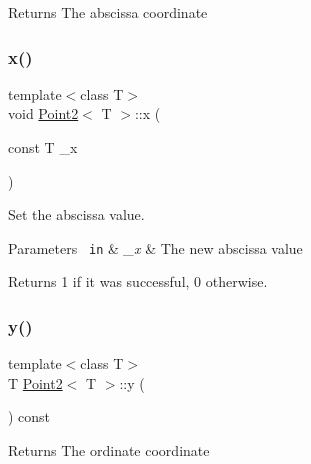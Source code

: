 \begin{DoxyReturn}{Returns}
The abscissa coordinate 
\end{DoxyReturn}
\mbox{\label{class_point2_a0693b1a0d34cb1dd3a4d30ea078a4d5e}} 
\subsubsection{\texorpdfstring{x()}{x()}\hspace{0.1cm}{\footnotesize\ttfamily [2/2]}}
{\footnotesize\ttfamily template$<$class T$>$ \\
void \mbox{\hyperlink{class_point2}{Point2}}$<$ T $>$\+::x (\begin{DoxyParamCaption}\item[{const T}]{\+\_\+x }\end{DoxyParamCaption})\hspace{0.3cm}{\ttfamily [inline]}}



Set the abscissa value. 


\begin{DoxyParams}[1]{Parameters}
\mbox{\texttt{ in}}  & {\em \+\_\+x} & The new abscissa value \\
\hline
\end{DoxyParams}
\begin{DoxyReturn}{Returns}
1 if it was successful, 0 otherwise. 
\end{DoxyReturn}
\mbox{\label{class_point2_ad7138ca15abc7937b9b1fdb0a84d229c}} 
\subsubsection{\texorpdfstring{y()}{y()}\hspace{0.1cm}{\footnotesize\ttfamily [1/2]}}
{\footnotesize\ttfamily template$<$class T$>$ \\
T \mbox{\hyperlink{class_point2}{Point2}}$<$ T $>$\+::y (\begin{DoxyParamCaption}{ }\end{DoxyParamCaption}) const\hspace{0.3cm}{\ttfamily [inline]}}

\begin{DoxyReturn}{Returns}
The ordinate coordinate 
\end{DoxyReturn}
\mbox{\label{class_point2_a967025762c1b4dede5eb822f5c29522e}} 
